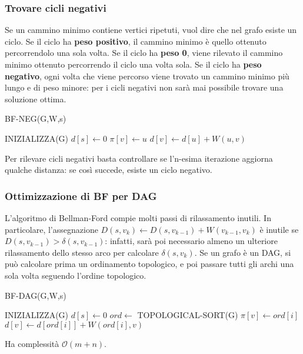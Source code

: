 \documentclass[11pt]{article}
\begin{document}
\subsubsection{Trovare cicli negativi}
Se un cammino minimo contiene vertici ripetuti, vuol dire che nel grafo esiste un ciclo.
Se il ciclo ha \textbf{peso positivo}, il cammino minimo è quello ottenuto percorrendolo una sola volta.
Se il ciclo ha \textbf{peso 0}, viene rilevato il cammino minimo ottenuto percorrendo il ciclo una volta sola.
Se il ciclo ha \textbf{peso negativo}, ogni volta che viene percorso viene trovato un cammino minimo più lungo e di peso 
minore: per i cicli negativi non sarà mai possibile trovare una soluzione ottima.
\begin{algorithm}
    \caption{BF-NEG(G,W,s)}
    \begin{algorithmic}
        \State INIZIALIZZA(G)
        \State $d[s]\gets 0$
                    \State $\pi[v]\gets u$
                    \State $d[v]\gets d[u]+W(u,v)$
                \EndIf 
            \EndFor
        \EndFor
            \\
            \EndIf
        \EndFor 
    \end{algorithmic}
\end{algorithm}
Per rilevare cicli negativi basta controllare se l'n-esima iterazione aggiorna qualche distanza: se così succede, esiste 
un ciclo negativo.
\subsubsection{Ottimizzazione di BF per DAG}
L'algoritmo di Bellman-Ford compie molti passi di rilassamento inutili. In particolare, l'assegnazione 
$D(s,v_k)\gets D(s,v_{k-1})+W(v_{k-1},v_k)$ è inutile se $D(s,v_{k-1})>\delta(s,v_{k-1})$: infatti, sarà poi necessario 
almeno un ulteriore rilassamento dello stesso arco per calcolare $\delta(s,v_{k})$.
Se un grafo è un DAG, si può calcolare prima un ordinamento topologico, e poi passare tutti gli archi una sola volta seguendo
l'ordine topologico.
\begin{algorithm}
    \caption{BF-DAG(G,W,s)}
    \begin{algorithmic}
        \State INIZIALIZZA(G)
        \State $d[s]\gets 0$
        \State $ord\gets$ TOPOLOGICAL-SORT(G)
                    \State $\pi[v]\gets ord[i]$
                    \State $d[v]\gets d[ord[i]]+W(ord[i],v)$
                \EndIf 
            \EndFor
        \EndFor
    \end{algorithmic}
\end{algorithm}
Ha complessità $\mathcal{O}(m+n)$.
\end{document}
